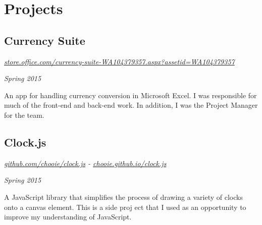 \section*{Projects}

\subsection*{Currency Suite}
\noindent\begin{minipage}[b]{0.8\textwidth}
  \flushleft
  \emph{\href{https://store.office.com/currency-suite-WA104379357.aspx?assetid=WA104379357} {store.office.com/currency-suite-WA104379357.aspx?assetid=WA104379357}}
\end{minipage}
\noindent\begin{minipage}[b]{0.2\textwidth}
  \flushright
  \emph{Spring 2015}
\end{minipage}
An app for handling currency conversion in Microsoft  Excel. I was responsible for much of the front-end and back-end work. In addition, I was the Project Manager for the team.

\subsection*{Clock.js}
\noindent\begin{minipage}[b]{0.5\textwidth}
  \flushleft
  \emph{\href{https://github.com/chooie/clock.js} {github.com/chooie/clock.js} - \href {https://chooie.github.io/clock.js} {chooie.github.io/clock.js}}
\end{minipage}
\noindent\begin{minipage}[b]{0.5\textwidth}
  \flushright
  \emph{Spring 2015}
\end{minipage}
A JavaScript library that simplifies the process of drawing a variety of clocks onto a canvas element. This is a side proj
ect that I used as an opportunity to improve my understanding of JavaScript.

